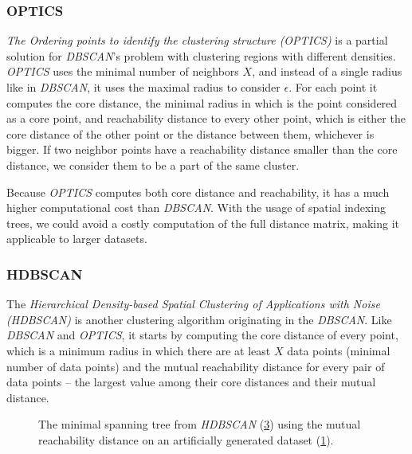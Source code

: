 \subsubsection{OPTICS}
\textit{The Ordering points to identify the clustering structure (OPTICS)} \cite{vis:optics} is a partial solution for \textit{DBSCAN}'s problem with clustering regions with different densities. \textit{OPTICS} uses the minimal number of neighbors $X$, and instead of a single radius like in \textit{DBSCAN}, it uses the maximal radius to consider $\epsilon$. For each point it computes the core distance, the minimal radius in which is the point considered as a core point, and reachability distance to every other point, which is either the core distance of the other point or the distance between them, whichever is bigger. If two neighbor points have a reachability distance smaller than the core distance, we consider them to be a part of the same cluster.

Because \textit{OPTICS} computes both core distance and reachability, it has a much higher computational cost than \textit{DBSCAN}. With the usage of spatial indexing trees, we could avoid a costly computation of the full distance matrix, making it applicable to larger datasets.

\subsubsection{HDBSCAN}
The \textit{Hierarchical Density-based Spatial Clustering of Applications with Noise (HDBSCAN)} \cite{vis:hdbscan} is another clustering algorithm originating in the \textit{DBSCAN}. Like \textit{DBSCAN} and \textit{OPTICS}, it starts by computing the core distance of every point, which is a minimum radius in which there are at least $X$ data points (minimal number of data points) and the mutual reachability distance for every pair of data points -- the largest value among their core distances and their mutual distance.
\begin{figure}[ht]
     \centering
     \begin{subfigure}[b]{0.495\textwidth}
        \centering
        
        \caption{}
        \label{fig:hdbscan_dataset}
     \end{subfigure}
     \hfill
     \begin{subfigure}[b]{0.495\textwidth}
        \centering
        
        \caption{}
        \label{fig:hdbscan_tree}
     \end{subfigure}
    \caption{The minimal spanning tree from \textit{HDBSCAN} (\ref{fig:hdbscan_tree}) using the mutual reachability distance on an artificially generated dataset (\ref{fig:hdbscan_dataset}).
    }
\end{figure}

